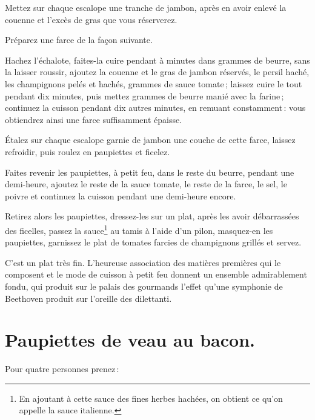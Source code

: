 Mettez sur chaque escalope une tranche de jambon, après en avoir enlevé la
couenne et l'excès de gras que vous réserverez.

Préparez une farce de la façon suivante.

Hachez l'échalote, faites-la cuire pendant {\mmm} à {\mmm} minutes
dans {\mmm} grammes de beurre, sans la laisser roussir, ajoutez la
couenne et le gras de jambon réservés, le persil haché, les champignons pelés
et hachés, {\mmm} grammes de sauce tomate ; laissez cuire le tout pendant
dix minutes, puis mettez {\mmm} grammes de beurre manié avec la farine ;
continuez la cuisson pendant dix autres minutes, en remuant constamment : vous
obtiendrez ainsi une farce suffisamment épaisse.

Étalez sur chaque escalope garnie de jambon une couche de cette farce, laissez
refroidir, puis roulez en paupiettes et ficelez.

Faites revenir les paupiettes, à petit feu, dans le reste du beurre, pendant
une demi-heure, ajoutez le reste de la sauce tomate, le reste de la farce, le
sel, le poivre et continuez la cuisson pendant une demi-heure encore.

Retirez alors les paupiettes, dressez-les sur un plat, après les avoir
débarrassées des ficelles, passez la sauce\footnote{En ajoutant à cette sauce
des fines herbes hachées, on obtient ce qu'on appelle la \label{pg0490}
\hypertarget{p0490}{}sauce italienne.} au tamis à l’aide d’un pilon, masquez-en
les paupiettes, garnissez le plat de tomates farcies de champignons grillés et
servez.

C'est un plat très fin. L'heureuse association des matières premières qui le
composent et le mode de cuisson à petit feu donnent un ensemble admirablement
fondu, qui produit sur le palais des gourmands l'effet qu'une symphonie de
Beethoven produit sur l'oreille des dilettanti.

\section*{\centering Paupiettes de veau au bacon.}
{}

Pour quatre personnes prenez :

\medskip

